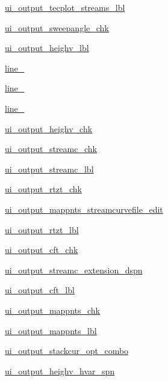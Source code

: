 \begin{DoxyCompactItemize}
\hyperlink{a00074_ad6ef09a5ac4e379fd644cd77d0db11ca}{ui\+\_\+output\+\_\+tecplot\+\_\+streams\+\_\+lbl}
\item 
\hyperlink{a00074_af13e62fd96ef8e9fd80f03ca365f9117}{ui\+\_\+output\+\_\+sweepangle\+\_\+chk}
\item 
\hyperlink{a00074_a8b6a216e0c5079501ecb0faf10f28a9b}{ui\+\_\+output\+\_\+heighv\+\_\+lbl}
\item 
\hyperlink{a00074_a7164809ee0f9eaf1fc8ef281866630e6}{line\+\_}
\item 
\hyperlink{a00074_af03231f676dd6187432bb4007a3056dd}{line\+\_}
\item 
\hyperlink{a00074_ad08c484a4323a6f6051cf71cfa1a208e}{line\+\_}
\item 
\hyperlink{a00074_a72d1aa573f44078c64d2e5c063ef15ba}{ui\+\_\+output\+\_\+heighv\+\_\+chk}
\item 
\hyperlink{a00074_a3a0f0c6441ea06c8a04d5dc13cb2dc8e}{ui\+\_\+output\+\_\+streamc\+\_\+chk}
\item 
\hyperlink{a00074_a1436e56fad76cd38cf1f87db08b539b8}{ui\+\_\+output\+\_\+streamc\+\_\+lbl}
\item 
\hyperlink{a00074_a336846c91ac57b8ab8ab0f2b5c5a0b9e}{ui\+\_\+output\+\_\+rtzt\+\_\+chk}
\item 
\hyperlink{a00074_a806b947963fcab17402d6c5b4cc16368}{ui\+\_\+output\+\_\+mappnts\+\_\+streamcurvefile\+\_\+edit}
\item 
\hyperlink{a00074_a17ad2111dee7da23381837dc87ce9a6c}{ui\+\_\+output\+\_\+rtzt\+\_\+lbl}
\item 
\hyperlink{a00074_a1b032189cdd7d3d01263d73bfd778d92}{ui\+\_\+output\+\_\+cft\+\_\+chk}
\item 
\hyperlink{a00074_ae4dbdbe6b6da83089c1ae51bb6cdb1e2}{ui\+\_\+output\+\_\+streamc\+\_\+extension\+\_\+dspn}
\item 
\hyperlink{a00074_ac2158a8a751f8d5478c20a551799d3b1}{ui\+\_\+output\+\_\+cft\+\_\+lbl}
\item 
\hyperlink{a00074_afcb54ff967d6a7fc001c9714f038ab80}{ui\+\_\+output\+\_\+mappnts\+\_\+chk}
\item 
\hyperlink{a00074_a96c4756f82fdfe6fa5385898c3d96a91}{ui\+\_\+output\+\_\+mappnts\+\_\+lbl}
\item 
\hyperlink{a00074_a9a81933c3dedf38f28446661eb6796fa}{ui\+\_\+output\+\_\+stackcur\+\_\+opt\+\_\+combo}
\item 
\hyperlink{a00074_af92fe733419818e322c45b716966440b}{ui\+\_\+output\+\_\+heighv\+\_\+hvar\+\_\+spn}
\item 

\end{DoxyCompactItemize}
